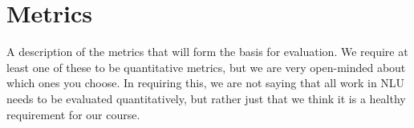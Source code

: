 \section{Metrics}
\label{sec:metrics}

A description of the metrics that will form the basis for evaluation. We require at least one of these to be quantitative metrics, but we are very open-minded about which ones you choose. In requiring this, we are not saying that all work in NLU needs to be evaluated quantitatively, but rather just that we think it is a healthy requirement for our course.